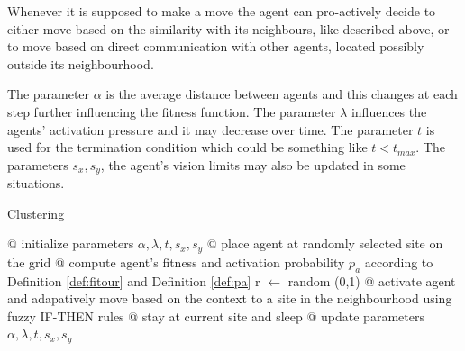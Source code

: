 Whenever it is supposed to make a move the agent can pro-actively decide to either move based on the similarity with its neighbours, like described above, or to move based on direct communication with other agents, located possibly outside its neighbourhood. 

The parameter $\alpha$ is the average distance  between agents and this changes at each step further influencing the fitness function. The parameter $\lambda$ influences the agents' activation pressure and it may decrease over time. The parameter $t$ is used for the  termination condition which could be something like \begin{math} t < t_{max}  \end{math}. The parameters $s_x, s_y$, the agent's vision limits may also be updated in some situations.  

\begin{algorithm}
\caption{Clustering}
\label{alg:clusteringcontext}
\begin{algorithmic}[1]
\STATE @ initialize parameters \begin{math}   \alpha, \lambda, t, s_x, s_y   \end{math}
		\STATE @ place agent at randomly selected site on the grid
	\ENDFOR
		\STATE @ compute agent’s fitness and activation probability $p_a$ according to Definition \ref{def:fitour} and 	Definition \ref{def:pa}
		\STATE r $\leftarrow$ random (0,1)
			\STATE @ activate agent and adapatively move based on the context to a site in the neighbourhood using fuzzy IF-THEN rules
		\ELSE @ stay at current site and sleep
		\ENDIF
		\ENDFOR
		\STATE @ update parameters \begin{math}   \alpha, \lambda, t, s_x, s_y   \end{math}
	\ENDWHILE
	
\end{algorithmic}
\end{algorithm}

